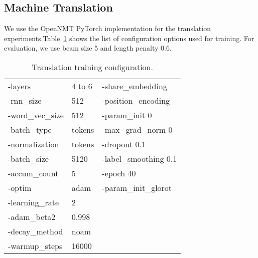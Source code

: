\documentclass[11pt,a4paper]{article}
\begin{document}
\subsection{Machine Translation}
\label{sec:appendix:mt}
We use the OpenNMT PyTorch implementation for the translation experiments.Table~\ref{table:option} shows the list of configuration options used for training.
For evaluation, we use beam size 5 and length penalty 0.6. 

\begin{table}[!h!]
\centering
\begin{tabular}{|@{~~}ll|l|}
\hline
-layers & 4 to 6 & -share\_embedding \\
-rnn\_size & 512 & -position\_encoding \\
-word\_vec\_size & 512 & -param\_init 0\\
-batch\_type & tokens & -max\_grad\_norm 0 \\
-normalization & tokens & -dropout 0.1\\
-batch\_size & 5120  & -label\_smoothing 0.1\\
-accum\_count & 5 & -epoch 40\\
-optim & adam & -param\_init\_glorot \\
-learning\_rate & 2 & \\
-adam\_beta2 & 0.998 & \\
-decay\_method & noam & \\
-warmup\_steps & 16000 & \\
\hline
\end{tabular}
\caption{Translation training configuration.}
\label{table:option}
\end{table}
\end{document}
